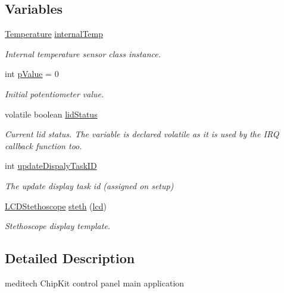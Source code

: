 \subsection*{Variables}
\begin{DoxyCompactItemize}
\item 
\hyperlink{class_temperature}{Temperature} \hyperlink{_meditech___chip_kit_control_panel_8pde_adcfca3504612462229db71750def77f9}{internal\-Temp}
\begin{DoxyCompactList}\small\item\em Internal temperature sensor class instance. \end{DoxyCompactList}\item 
int \hyperlink{_meditech___chip_kit_control_panel_8pde_a3134d7e85042180eb421c3f6ee88d3b3}{p\-Value} = 0
\begin{DoxyCompactList}\small\item\em Initial potentiometer value. \end{DoxyCompactList}\item 
volatile boolean \hyperlink{_meditech___chip_kit_control_panel_8pde_adea51712174a5f82a31231a67e0d4608}{lid\-Status}
\begin{DoxyCompactList}\small\item\em Current lid status. The variable is declared volatile as it is used by the I\-R\-Q callback function too. \end{DoxyCompactList}\item 
int \hyperlink{_meditech___chip_kit_control_panel_8pde_a527a89c41abb1d8660b53f5e727e655c}{update\-Dispaly\-Task\-I\-D}
\begin{DoxyCompactList}\small\item\em The update display task id (assigned on setup) \end{DoxyCompactList}\item 
\hyperlink{class_l_c_d_stethoscope}{L\-C\-D\-Stethoscope} \hyperlink{_meditech___chip_kit_control_panel_8pde_ac2215fe61cf27d0fc83fa54cf1db73fc}{steth} (\hyperlink{_meditech___chip_kit_control_panel_8pde_ae0b100905fb0ed88dddaafda0aa05379}{lcd})
\begin{DoxyCompactList}\small\item\em Stethoscope display template. \end{DoxyCompactList}\end{DoxyCompactItemize}


\subsection{Detailed Description}
meditech Chip\-Kit control panel main application 

